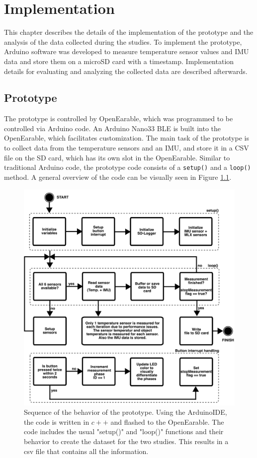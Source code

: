 \chapter{Implementation}
\label{ch:Implementation}
This chapter describes the details of the implementation of the prototype and the analysis of the data collected during the studies.
To implement the prototype, Arduino software was developed to measure temperature sensor values and IMU data and store them on a microSD card with a timestamp.
Implementation details for evaluating and analyzing the collected data are described afterwards.

\section{Prototype}
The prototype is controlled by OpenEarable, which was programmed to be controlled via Arduino code. 
An Arduino Nano33 BLE is built into the OpenEarable, which facilitates customization. 
The main task of the prototype is to collect data from the temperature sensors and an IMU, and store it in a CSV file on the SD card, which has its own slot in the OpenEarable. 
Similar to traditional Arduino code, the prototype code consists of a \texttt{setup()} and a \texttt{loop()} method.
A general overview of the code can be visually seen in Figure \ref{fig:ch:Implementation:ArduinoCodeProcedure}.

\begin{figure}[!t]
    \centering
    \includegraphics[width=\textwidth]{thesis-doc/images/ArduinoCodeProcedure2.pdf}
    \caption{Sequence of the behavior of the prototype. Using the ArduinoIDE, the code is written in $c++$ and flashed to the OpenEarable. The code includes the usual "setup()" and "loop()" functions and their behavior to create the dataset for the two studies.
This results in a csv file that contains all the information.}
    \label{fig:ch:Implementation:ArduinoCodeProcedure}
\end{figure}

